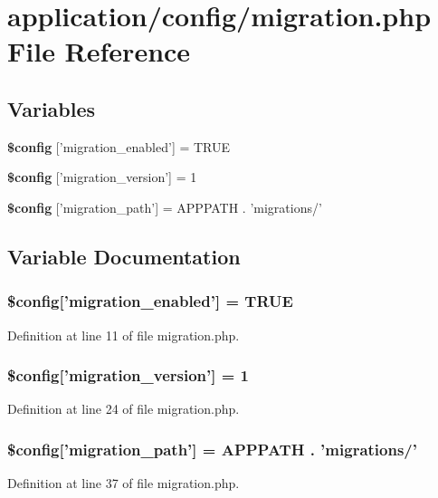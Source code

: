 \section{application/config/migration.php File Reference}
\label{application_2config_2migration_8php}
\subsection*{Variables}
\begin{DoxyCompactItemize}
\item 
{\bf \$config} ['migration\-\_\-enabled'] = T\-R\-U\-E
\item 
{\bf \$config} ['migration\-\_\-version'] = 1
\item 
{\bf \$config} ['migration\-\_\-path'] = A\-P\-P\-P\-A\-T\-H . 'migrations/'
\end{DoxyCompactItemize}


\subsection{Variable Documentation}
\subsubsection[{\$config}]{\setlength{\rightskip}{0pt plus 5cm}\$config['migration\-\_\-enabled'] = T\-R\-U\-E}\label{application_2config_2migration_8php_ad6392796c28d7391c3977c2cceef3cc2}


Definition at line 11 of file migration.\-php.

\subsubsection[{\$config}]{\setlength{\rightskip}{0pt plus 5cm}\$config['migration\-\_\-version'] = 1}\label{application_2config_2migration_8php_a53ca48939aaf8c92f0c0d239a294fff2}


Definition at line 24 of file migration.\-php.

\subsubsection[{\$config}]{\setlength{\rightskip}{0pt plus 5cm}\$config['migration\-\_\-path'] = A\-P\-P\-P\-A\-T\-H . 'migrations/'}\label{application_2config_2migration_8php_abc04383313304e348060a7ee39f5a8ee}


Definition at line 37 of file migration.\-php.

